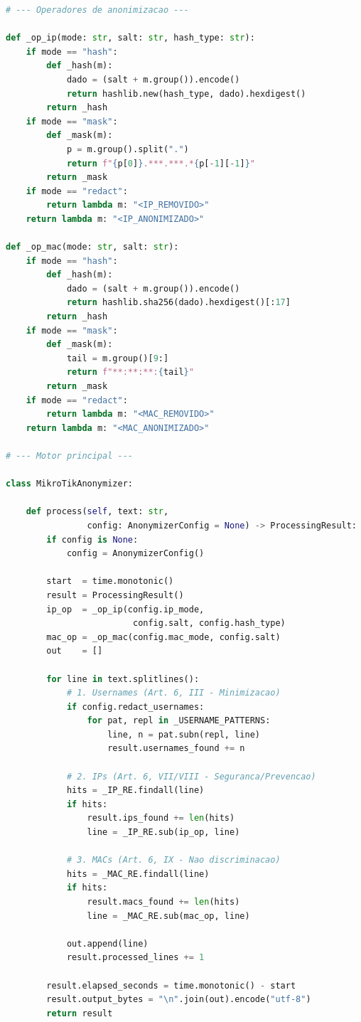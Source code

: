 \begin{lstlisting}[language=Python,
    caption={Pipeline de anonimizacao de logs MikroTik -- core\_anonymizer.py},
    label={lst:core-completo}]
# --- Operadores de anonimizacao ---

def _op_ip(mode: str, salt: str, hash_type: str):
    if mode == "hash":
        def _hash(m):
            dado = (salt + m.group()).encode()
            return hashlib.new(hash_type, dado).hexdigest()
        return _hash
    if mode == "mask":
        def _mask(m):
            p = m.group().split(".")
            return f"{p[0]}.***.***.*{p[-1][-1]}"
        return _mask
    if mode == "redact":
        return lambda m: "<IP_REMOVIDO>"
    return lambda m: "<IP_ANONIMIZADO>"

def _op_mac(mode: str, salt: str):
    if mode == "hash":
        def _hash(m):
            dado = (salt + m.group()).encode()
            return hashlib.sha256(dado).hexdigest()[:17]
        return _hash
    if mode == "mask":
        def _mask(m):
            tail = m.group()[9:]
            return f"**:**:**:{tail}"
        return _mask
    if mode == "redact":
        return lambda m: "<MAC_REMOVIDO>"
    return lambda m: "<MAC_ANONIMIZADO>"

# --- Motor principal ---

class MikroTikAnonymizer:

    def process(self, text: str,
                config: AnonymizerConfig = None) -> ProcessingResult:
        if config is None:
            config = AnonymizerConfig()

        start  = time.monotonic()
        result = ProcessingResult()
        ip_op  = _op_ip(config.ip_mode,
                         config.salt, config.hash_type)
        mac_op = _op_mac(config.mac_mode, config.salt)
        out    = []

        for line in text.splitlines():
            # 1. Usernames (Art. 6, III - Minimizacao)
            if config.redact_usernames:
                for pat, repl in _USERNAME_PATTERNS:
                    line, n = pat.subn(repl, line)
                    result.usernames_found += n

            # 2. IPs (Art. 6, VII/VIII - Seguranca/Prevencao)
            hits = _IP_RE.findall(line)
            if hits:
                result.ips_found += len(hits)
                line = _IP_RE.sub(ip_op, line)

            # 3. MACs (Art. 6, IX - Nao discriminacao)
            hits = _MAC_RE.findall(line)
            if hits:
                result.macs_found += len(hits)
                line = _MAC_RE.sub(mac_op, line)

            out.append(line)
            result.processed_lines += 1

        result.elapsed_seconds = time.monotonic() - start
        result.output_bytes = "\n".join(out).encode("utf-8")
        return result
\end{lstlisting}